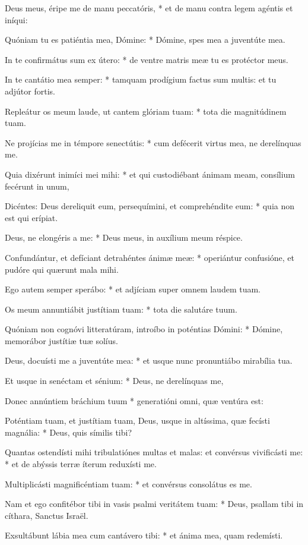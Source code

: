 Deus meus, éripe me de manu peccatóris, * et de manu contra legem agéntis et iníqui:

Quóniam tu es patiéntia mea, Dómine: * Dómine, spes mea a juventúte mea.

In te confirmátus sum ex útero: * de ventre matris meæ tu es protéctor meus.

In te cantátio mea semper: * tamquam prodígium factus sum multis: et tu adjútor fortis.

Repleátur os meum laude, ut cantem glóriam tuam: * tota die magnitúdinem tuam.

Ne projícias me in témpore senectútis: * cum defécerit virtus mea, ne derelínquas me.

Quia dixérunt inimíci mei mihi: * et qui custodiébant ánimam meam, consílium fecérunt in unum,

Dicéntes: Deus dereliquit eum, persequímini, et comprehéndite eum: * quia non est qui erípiat.

Deus, ne elongéris a me: * Deus meus, in auxílium meum réspice.

Confundántur, et defíciant detrahéntes ánimæ meæ: * operiántur confusióne, et pudóre qui quærunt mala mihi.

Ego autem semper sperábo: * et adjíciam super omnem laudem tuam.

Os meum annuntiábit justítiam tuam: * tota die salutáre tuum.

Quóniam non cognóvi litteratúram, introíbo in poténtias Dómini: * Dómine, memorábor justítiæ tuæ solíus.

Deus, docuísti me a juventúte mea: * et usque nunc pronuntiábo mirabília tua.

Et usque in senéctam et sénium: * Deus, ne derelínquas me,

Donec annúntiem bráchium tuum * generatióni omni, quæ ventúra est:

Poténtiam tuam, et justítiam tuam, Deus, usque in altíssima, quæ fecísti magnália: * Deus, quis símilis tibi?

Quantas ostendísti mihi tribulatiónes multas et malas: et convérsus vivificásti me: * et de abýssis terræ íterum reduxísti me.

Multiplicásti magnificéntiam tuam: * et convérsus consolátus es me.

Nam et ego confitébor tibi in vasis psalmi veritátem tuam: * Deus, psallam tibi in cíthara, Sanctus Israël.

Exsultábunt lábia mea cum cantávero tibi: * et ánima mea, quam redemísti.

